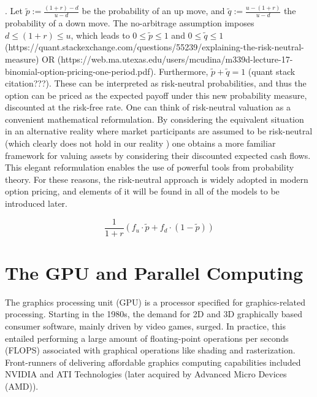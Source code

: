 \documentclass[english,12pt,a4paper,pdftex,sci,utf8]{aaltothesis}
\begin{document}
. Let $\tilde p := \frac{(1+r)-d}{u-d}$ be the probability of an up move, and  $\tilde q := \frac{u-(1+r)}{u-d}$ the probability of a down move. The no-arbitrage assumption imposes $d \leq (1+r) \leq u$, which leads to $0 \leq \tilde p \leq 1$ and  $0 \leq \tilde q \leq 1$ (https://quant.stackexchange.com/questions/55239/explaining-the-risk-neutral-measure) OR (https://web.ma.utexas.edu/users/mcudina/m339d-lecture-17-binomial-option-pricing-one-period.pdf). Furthermore, $\tilde p + \tilde q = 1$ (quant stack citation???). These can be interpreted as risk-neutral probabilities, and thus the option can be priced as the expected payoff under this new probability measure, discounted at the risk-free rate. One can think of risk-neutral valuation as a convenient mathematical reformulation. By considering the equivalent situation in an alternative reality where market participants are assumed to be risk-neutral (which clearly does not hold in our reality \cite{kahneman2013prospect}) one obtains a more familiar framework for valuing assets by considering their discounted expected cash flows. This elegant reformulation enables the use of powerful tools from probability theory. For these reasons, the risk-neutral approach is widely adopted in modern option pricing, and elements of it will be found in all of the models to be introduced later. \cite{gisiger2010risk} \cite{tham2001risk}

\begin{equation}
     \frac{1}{1+r}(f_u\cdot \tilde p + f_d \cdot (1-\tilde p))
\label{risk-neutral-expectancy}
\end{equation}




\section{The GPU and Parallel Computing} \label{sec:gpu}
The graphics processing unit (GPU) is a processor specified for graphics-related processing. Starting in the 1980s, the demand for 2D and 3D graphically based consumer software, mainly driven by video games, surged. In practice, this entailed performing a large amount of floating-point operations per seconds (FLOPS) associated with graphical operations like shading and rasterization. Front-runners of delivering affordable graphics computing capabilities included NVIDIA and ATI Technologies (later acquired by Advanced Micro Devices (AMD)).\cite{sanders2010cuda} \cite{kirk2016programming}
\end{document}
